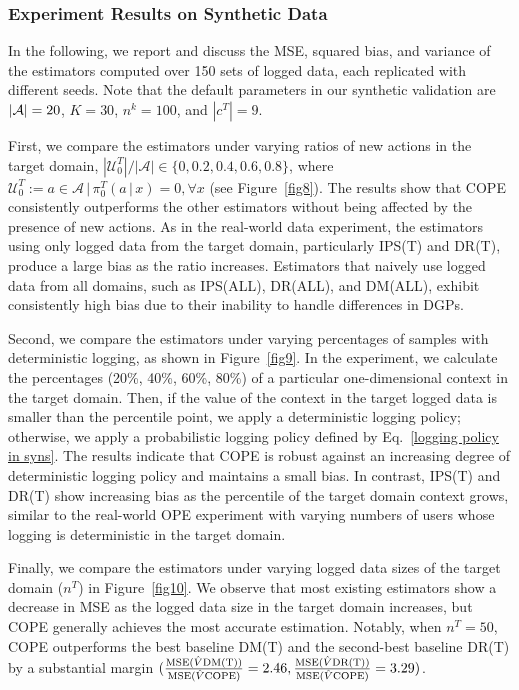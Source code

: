 \subsubsection{Experiment Results on Synthetic Data} 
In the following, we report and discuss the MSE, squared bias, and variance of the estimators computed over 150 sets of logged data, each replicated with different seeds. Note that the default parameters in our synthetic validation are $|\mathcal{A}|= 20$, $K=30$, $n^{k}=100$, and $|c^T|= 9$.

First, we compare the estimators under varying ratios of new actions in the target domain, $|\mathcal{U}_0^T|/|\mathcal{A}| \in \{0, 0.2, 0.4, 0.6, 0.8\}$, where $\mathcal{U}_0^T:= {a \in \mathcal{A} \,|\, \pi_0^T(a \,|\, x) = 0, \forall x}$ (see Figure~\ref{fig8}). The results show that COPE consistently outperforms the other estimators without being affected by the presence of new actions. As in the real-world data experiment, the estimators using only logged data from the target domain, particularly IPS(T) and DR(T), produce a large bias as the ratio increases. Estimators that naively use logged data from all domains, such as IPS(ALL), DR(ALL), and DM(ALL), exhibit consistently high bias due to their inability to handle differences in DGPs.

Second, we compare the estimators under varying percentages of samples with deterministic logging, as shown in Figure~\ref{fig9}. In the experiment, we calculate the percentages (20\%, 40\%, 60\%, 80\%) of a particular one-dimensional context in the target domain. Then, if the value of the context in the target logged data is smaller than the percentile point, we apply a deterministic logging policy; otherwise, we apply a probabilistic logging policy defined by Eq.~\eqref{logging policy in syns}. The results indicate that COPE is robust against an increasing degree of deterministic logging policy and maintains a small bias. In contrast, IPS(T) and DR(T) show increasing bias as the percentile of the target domain context grows, similar to the real-world OPE experiment with varying numbers of users whose logging is deterministic in the target domain.

Finally, we compare the estimators under varying logged data sizes of the target domain ($n^T$) in Figure~\ref{fig10}. We observe that most existing estimators show a decrease in MSE as the logged data size in the target domain increases, but COPE generally achieves the most accurate estimation. Notably, when $n^T = 50$, COPE outperforms the best baseline DM(T) and the second-best baseline DR(T) by a substantial margin $(\frac{\mathrm{MSE}(\hat{V}{\rm{DM(T)}})}{\mathrm{MSE}(\hat{V}{\rm{COPE}})} = 2.46, \frac{\mathrm{MSE}(\hat{V}{\rm{DR(T)}})}{\mathrm{MSE}(\hat{V}{\rm{COPE}})} = 3.29)$.

